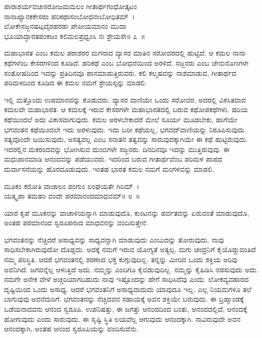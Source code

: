\begin{shloka}
ಪಾರಾಶರ್ಯವಚಃಸರೋಜಮಮಲಂ ಗೀತಾರ್ಥಗಂಧೋತ್ಕಟಂ\\ನಾನಾಖ್ಯಾನಕಕೇಸರಂ ಹರಿಕಥಾಸಂಬೋಧನಾಬೋಧಿತಮ್~।\\ಲೋಕೇಸಜ್ಜನಷಟ್ಪದೈರಹರಹಃ ಪೇಪೀಯಮಾನಂ ಮುದಾ\\ಭೂಯಾದ್ಭಾರತಪಂಕಜಂ ಕಲಿಮಲಪ್ರಧ್ವಂಸಿ ನಃ ಶ್ರೇಯಸೇ\hfill॥ ೭~॥
\end{shloka}

\begin{artha}
ಮಹಾಭಾರತ ಎಂಬ ಕಮಲ ಪರಾಶರರ ಮಗನಾದ ವ್ಯಾಸರ ಮಾತಿನ ಸರೋವರದಲ್ಲಿ ಹುಟ್ಟಿದೆ. ಆ ಕಮಲ ನಾನಾ ಕಥೆಗಳೆಂಬ ಕೇಸರಗಳಿಂದ ಕೂಡಿದೆ. ಹರಿಕಥೆ ಎಂಬ ಬೋಧನೆಯಿಂದ ಅರಳಿದೆ. ಸಜ್ಜನರು ಎಂಬ ಜೇನುನೊಣಗಳೇ ಸಂತೋಷದಿಂದ ಇದನ್ನು ಪ್ರತಿದಿನವೂ ಪಾನಮಾಡುತ್ತಿರುವರು. ಕಲಿ ಕಲ್ಮಷವನ್ನು ನಾಶಮಾಡುವ, ಗೀತಾರ್ಥದ ಪರಿಮಳದಿಂದ ಕೂಡಿದ ಈ ಕಮಲ ನಮಗೆ ಶ್ರೇಯಸ್ಸನ್ನು ಮಾಡಲಿ.
\end{artha}

ಇಲ್ಲಿ ಮತ್ತೊಂದು ಉಪಮಾನವನ್ನು ಕೊಡುವರು. ವ್ಯಾಸರ ವಾಣಿಯೇ ಒಂದು ಸರೋವರ, ಅದರಲ್ಲಿ ವಿಕಸಿತವಾದ ಕಮಲವೇ ಮಹಾಭಾರತ. ಆ ಕಮಲಕ್ಕೆ ಇರುವ ಕೇಸರಗಳೇ ಮಹಾಭಾರತದಲ್ಲಿ ಬರುವ ಕಥೋಪಕಥೆಗಳು. ಹರಿಯ ಕಥೆಯಿಂದಲೆ ಅದು ವಿಕಾಸವಾಗುವುದು. ಕಮಲ ಅರಳಬೇಕಾದರೆ ಮೇಲೆ ಸೂರ್ಯ ಮೂಡಬೇಕು, ಹಾಗೆಯೇ ಭಗವಂತನ ಕಥೆಯಿಂದಲೇ ಇದು ಅರಳುವುದು. ಇದು ಬರೀ ಕಥೆಯಲ್ಲ, ಭಗವದ್​ವಾಣಿಯನ್ನು ನಿರೂಪಿಸುವುದು. ಸತ್ಯವೊಂದೇ ಜಯಿಸುವುದು, ಅಸತ್ಯವಲ್ಲ ಎಂಬ ಸನಾತನ ತತ್ವವನ್ನು ಸಾರುವುದಕ್ಕಾಗಿಯೇ ಈ ಕಥೆ ಹುಟ್ಟಿರುವುದು. ಇದರಲ್ಲಿನ ಮಕರಂದವನ್ನು ಭೋಗಿಸುವ ದುಂಬಿಗಳೇ ಸಜ್ಜನರು. ದಿನದಿನವೂ ಇದನ್ನು ಮುತ್ತಿರುವುವು. ಈ ಮಧುಪಾನಮಾಡಿ ಆನಂದವನ್ನು ಪಡೆಯುವರು. ಇದರಿಂದ ಬರುವ ಗೀತಾರ್ಥವೆಂಬ ಪರಿಮಳ ಪಾಪದ ದುರ್ವಾಸನೆಯನ್ನು ಹೊರದೂಡುವುದು. ಇಂತಹ ಭಾರತ ಕಮಲ ನಮಗೆ ಮಂಗಳವನ್ನು ಮಾಡಲಿ.

\begin{shloka}
ಮೂಕಂ ಕರೋತಿ ವಾಚಾಲಂ ಪಂಗುಂ ಲಂಘಯತೇ ಗಿರಿಮ್~।\\ಯತ್ಕೃಪಾ ತಮಹಂ ವಂದೇ ಪರಮಾನಂದಮಾಧವಮ್\hfill॥ ೮~॥
\end{shloka}

\begin{artha}
ಯಾರ ಕೃಪೆ ಮೂಕನನ್ನು ವಾಚಾಳಿಯನ್ನಾಗಿ ಮಾಡುವುದೊ, ಕುಂಟನನ್ನು ಪರ್ವತವನ್ನು ಏರುವಂತೆ ಮಾಡುವುದೊ, ಅಂತಹ ಪರಮಾನಂದ ಸ್ವರೂಪನಾದ ಮಾಧವನನ್ನು ವಂದಿಸುತ್ತೇನೆ.
\end{artha}

ಭಗವಂತನನ್ನು ನೆಚ್ಚಿದರೆ ಅಸಾಧ್ಯವನ್ನು ಸಾಧ್ಯವನ್ನಾಗಿ ಮಾಡುವುದು ಎಂಬುದನ್ನು ತೋರುವುದು. ನಾವು ಸಾಧಿಸಬೇಕಾಗಿರುವುದೋ ದೊಡ್ಡದು. ಅದಕ್ಕೆ ನಮಗೆ ಇರುವ ಯೋಗ್ಯತೆ ಅತ್ಯಲ್ಪ. ಮಗು ಚಂದ್ರನಿಗೆ ಕೈಯೊಡ್ಡುವಂತಿದೆ ನಮ್ಮ ಪರಿಸ್ಥಿತಿ. ಆದರೆ ಭಗವಂತನಲ್ಲಿ ಶರಣಾದ ಭಕ್ತ ಕುಗ್ಗುವುದಿಲ್ಲ. ತನ್ನನ್ನು ಮೀರಿದ ಒಂದು ಶಕ್ತಿಯ ಅರಿವು ಅವನಿಗಿದೆ. ಜಗವನ್ನೆಲ್ಲ ಆಳುತ್ತಿದೆ ಅದು. ನಮ್ಮನ್ನು ಎಂದಿಗೂ ಕೈಬಿಡುವುದಿಲ್ಲ. ನಮ್ಮನ್ನು ಕೈಹಿಡಿಸಿ ನಡಸುವುದು ಅದು. ನಮಗೇ ಅನೇಕ ವೇಳೆ ಅಚ್ಚರಿಯಾಗಬಹುದು ನಾವು ಇಷ್ಟೊಂದನ್ನು ಹೇಗೆ ಸಾಧಿಸಿದೆವು ಎಂದು. ಲೋಕವ್ಯವಹಾರದ ದೃಷ್ಟಿಯಿಂದ ಒಂದು ಅಸಾಧ್ಯ. ಆದರೆ ಭಗವಂತನಿಗೆ ಅಸಾಧ್ಯವಾದುದು ಯಾವುದೂ ಇಲ್ಲ. ಎಲ್ಲ ನಿಯಮಗಳೂ ತಲೆ ಬಾಗುವುವು ಅವನೆದುರಿಗೆ. ಭಗವಂತನನ್ನು ನೆಚ್ಚಿದವನ ಸಹಾಯಕ್ಕೆ ಅವನ ಶಕ್ತಿಯೇ ಬರುವುದು. ಈ ಬ್ರಹ್ಮಾಂಡಕ್ಕೆ ಒಡೆಯನಾದವನು ಆನಂದ ಸ್ವರೂಪಿ. ಉಪನಿಷತ್ತು, ಈ ಜಗತ್ತು ಆನಂದದಿಂದ ಬಂತು, ಆನಂದದಲ್ಲಿದೆ, ಆನಂದಕ್ಕೆ ಹೋಗುವುದು ಎಂದು ಸಾರುವುದು. ಈ ಸೃಷ್ಟಿ ಸ್ಥಿತಿ ಲಯವೆಲ್ಲ ಆಗುವುದು ಆನಂದಕ್ಕಾಗಿ. ನಾವಿರುವುದೇ ಅವನ ಆನಂದಕ್ಕಾಗಿ, ಅಂತಹ ಆನಂದ ಸ್ವರೂಪಿಯನ್ನು ವಂದಿಸುವೆನು.

